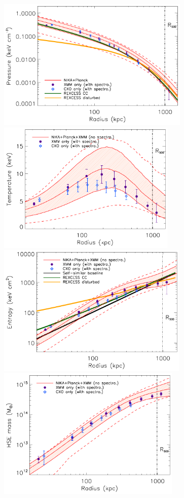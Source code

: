 \documentclass[twocolumn,traditabstract]{aa}
\begin{document}
\begin{figure}[h]
\centering
\includegraphics[height=6.3cm]{Figure/ICM_pressure_profile_xray.pdf}
\includegraphics[height=6.3cm]{Figure/ICM_temperature_profile.pdf}
\includegraphics[height=6.3cm]{Figure/ICM_entropy_profile.pdf}
\includegraphics[height=6.3cm]{Figure/ICM_mass_profile.pdf}

\end{figure}
\end{document}
